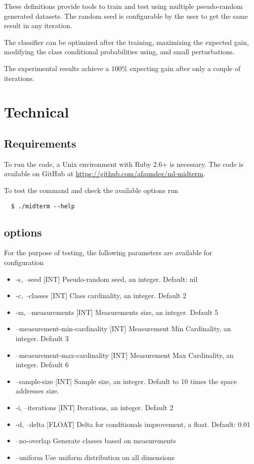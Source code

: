\documentclass[letterpaper, conference]{IEEEtran}
\begin{document}
These definitions provide tools to train and test using multiple pseudo-random generated datasets. The random seed is configurable by the user to get the same result in any iteration.

The classifier can be optimized after the training, maximizing the expected gain, modifying the class conditional probabilities using, and small perturbations.

The experimental results achieve a 100\% expecting gain after only a couple of iterations.

\section{Technical}

\subsection{Requirements}

To run the code, a Unix environment with Ruby 2.6+ is necessary. The code is available on GitHub at \url{https://github.com/afaundez/ml-midterm}.

To test the command and check the available options run

\begin{verbatim}
  $ ./midterm --help
\end{verbatim}

\subsection{options}

For the purpose of testing, the following parameters are available for configuration

\begin{itemize}
    \item-s, --seed [INT]                 Pseudo-random seed, an integer. Default: nil
    \item-c, --classes [INT]              Class cardinality, an integer. Default 2
    \item-m, --measurements [INT]         Measurements size, an integer. Default 5
    \item    --measurement-min-cardinality [INT]
                                     Measurement Min Cardinality, an integer. Default 3
    \item    --measurement-max-cardinality [INT]
                                     Measurement Max Cardinality, an integer. Default 6
    \item    --sample-size [INT]          Sample size, an integer. Default to 10 times the  space addresses size.
    \item-i, --iterations [INT]           Iterations, an integer. Default 2
    \item-d, --delta [FLOAT]              Delta for conditionals improvement, a float. Default: 0.01
    \item    --no-overlap                 Generate classes based on measurements
    \item    --uniform                    Use uniform distribution on all dimensions
\end{itemize}
\end{document}
